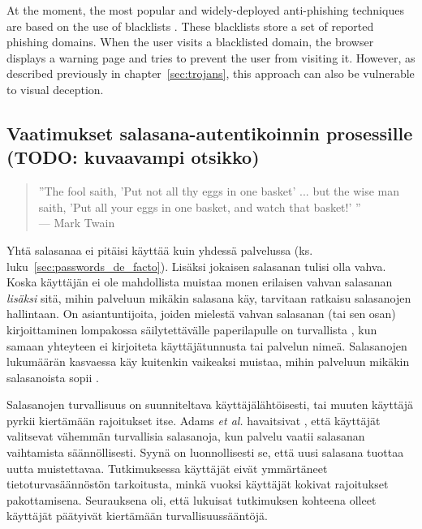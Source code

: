 \documentclass[english,gradu]{tktltiki}
\begin{document}
At the moment, the most popular and widely-deployed anti-phishing techniques are based on the use of blacklists \cite{visual_similarity_phishing_2008}. These blacklists store a set of reported phishing domains. When the user visits a blacklisted domain, the browser displays a warning page and tries to prevent the user from visiting it. However, as described previously in chapter~\ref{sec:trojans}, this approach can also be vulnerable to visual deception.



\subsection{Vaatimukset salasana-autentikoinnin prosessille (TODO: kuvaavampi otsikko)} %
\label{sub:vaatimukset_salasana_autentikoinnin_prosessille_todo_kuvaavampi_otsikko_}

           \begin{quote}
               ''The fool saith, 'Put not all thy eggs in one basket' ...
               but the wise man saith, 'Put all your eggs in one basket, and watch that basket!' ''
               \\--- Mark Twain \cite{twain_eggs_1894}
           \end {quote}

         Yhtä salasanaa ei pitäisi käyttää kuin yhdessä palvelussa (ks. luku~\ref{sec:passwords_de_facto}). Lisäksi jokaisen salasanan tulisi olla vahva. Koska käyttäjän ei ole mahdollista muistaa monen erilaisen vahvan salasanan \emph{lisäksi} sitä, mihin palveluun mikäkin salasana käy, tarvitaan ratkaisu salasanojen hallintaan. On asiantuntijoita, joiden mielestä vahvan salasanan (tai sen osan) kirjoittaminen lompakossa säilytettävälle paperilapulle on turvallista \cite{fsecure_passwords_on_postit_09, microsoft_guru_write_your_password_05, schneier_changing_passwords_10, schneier_choosing_passwords_07, schneier_write_down_your_password_05}, kun samaan yhteyteen ei kirjoiteta käyttäjätunnusta tai palvelun nimeä. Salasanojen lukumäärän kasvaessa käy kuitenkin vaikeaksi muistaa, mihin palveluun mikäkin salasanoista sopii \cite{study_of_passwords_07}.

         Salasanojen turvallisuus on suunniteltava käyttäjälähtöisesti, tai muuten käyttäjä pyrkii kiertämään rajoitukset itse. Adams \emph{et al.} havaitsivat \cite{users_are_not_the_enemy_99}, että käyttäjät valitsevat vähemmän turvallisia salasanoja, kun palvelu vaatii salasanan vaihtamista säännöllisesti. Syynä on luonnollisesti se, että uusi salasana tuottaa uutta muistettavaa. Tutkimuksessa käyttäjät eivät ymmärtäneet tietoturvasäännöstön tarkoitusta, minkä vuoksi käyttäjät kokivat rajoitukset pakottamisena. Seurauksena oli, että lukuisat tutkimuksen kohteena olleet käyttäjät päätyivät kiertämään turvallisuussääntöjä.
\end{document}
